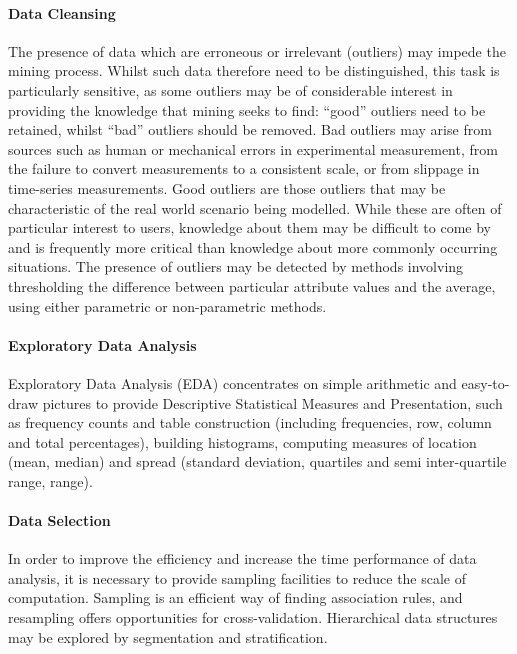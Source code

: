 \documentclass[a4paper,12pt,notitlepage,pdftex]{scrreprt}
\begin{document}
        \paragraph{Data Cleansing}
            The presence of data which are erroneous or irrelevant (outliers) may impede the mining process.
            Whilst such data therefore need to be distinguished, this task is particularly sensitive, as some outliers
            may be of considerable interest in providing the knowledge that mining seeks to find: ``good'' outliers
            need to be retained, whilst ``bad'' outliers should be removed.
            Bad outliers may arise from sources such as human or mechanical errors in experimental measurement, from
            the failure to convert measurements to a consistent scale, or from slippage in time-series measurements.
            Good outliers are those outliers that may be characteristic of the real world scenario being modelled.
            While these are often of particular interest to users, knowledge about them may be difficult to come by
            and is frequently more critical than knowledge about more commonly occurring situations.
            The presence of outliers may be detected by methods involving thresholding the difference between
            particular attribute values and the average, using either parametric or non-parametric methods.

        \paragraph{Exploratory Data Analysis}
            Exploratory Data Analysis (EDA) concentrates on simple arithmetic and easy-to-draw pictures to provide
            Descriptive Statistical Measures and Presentation, such as frequency counts and table construction
            (including frequencies, row, column and total percentages), building histograms, computing measures of
            location (mean, median) and spread (standard deviation, quartiles and semi inter-quartile range, range).

        \paragraph{Data Selection}
            In order to improve the efficiency and increase the time performance of data analysis, it is necessary to
            provide sampling facilities to reduce the scale of computation.
            Sampling is an efficient way of finding association rules, and resampling offers opportunities for
            cross-validation.
            Hierarchical data structures may be explored by segmentation and stratification.
\end{document}

